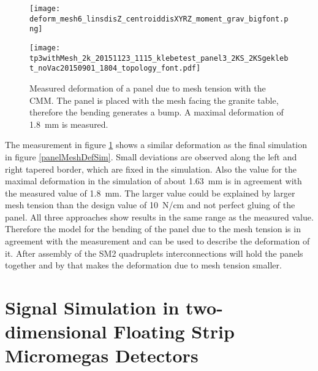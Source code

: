 \documentclass[
a4paper,                                %
twoside,                                %
BCOR1.4cm,                      %
10pt,                           %
headings=normal,                %
headsepline,                    %
clearplainpage, %
final,                                  %
div=14,
parskip=full,
openright,
bibliography=toc
]{scrreprt}
\begin{document}
\captionsetup[figure]{format=plain, labelsep=newline}
\begin{figure}[H]
	\begin{minipage}[b]{0.45\linewidth}
		\centering
		\texttt{[image: deform\_mesh6\_linsdisZ\_centroiddisXYRZ\_moment\_grav\_bigfont.png]}
		\vspace{3mm}
		\caption{Simulated deformation of a panel due to mesh tension. The approximation for the influence of the mesh tension is a torsional moment, which is transfered to the borders of the panel. As boundary conditions gravity and the fixation of the borders are assigned. A maximal deformation of \SI{1.63}{\mm} is simulated.}
		\label{panelMeshDefSim}
	\end{minipage}
	\hspace{0.5cm}
	\begin{minipage}[b]{0.45\linewidth}
		\centering
		\texttt{[image: tp3withMesh\_2k\_20151123\_1115\_klebetest\_panel3\_2KS\_2KSgeklebt\_noVac20150901\_1804\_topology\_font.pdf]}
		\caption{Measured deformation of a panel due to mesh tension with the CMM. The panel is placed with the mesh facing the granite table, therefore the bending generates a bump. A maximal deformation of \SI{1.8}{\mm} is measured.}
		\label{panelMeshDefMeas}
		\vspace{8.5mm}
	\end{minipage}
\end{figure}
\captionsetup[figure]{format=hang, labelsep=colon}

The measurement in figure \ref{panelMeshDefMeas} shows a similar deformation as the final simulation in figure \ref{panelMeshDefSim}. Small deviations are observed along the left and right tapered border, which are fixed in the simulation. Also the value for the maximal deformation in the simulation of about \SI{1.63}{\mm} is in agreement with the measured value of \SI{1.8}{\mm}. The larger value could be explained by larger mesh tension than the design value of \SI{10}{\N/\cm} and not perfect gluing of the panel. 
%
All three approaches show results in the same range as the measured value. Therefore the model for the bending of the panel due to the mesh tension is in agreement with the measurement and can be used to describe the deformation of it. After assembly of the SM2 quadruplets interconnections will hold the panels together and by that makes the deformation due to mesh tension smaller.

\chapter{Signal Simulation in two-dimensional Floating Strip Micromegas Detectors}
\end{document}
